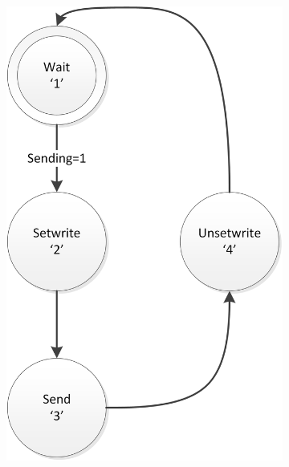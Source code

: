 \documentclass{report}
\begin{document}
\begin{figure}[H]
\begin{subfigure}{0.40\linewidth}
\includegraphics[width=\linewidth]{FSMSender}
\end{subfigure}
\end{figure}
\end{document}
